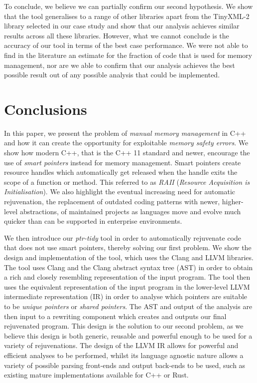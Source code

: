 \documentclass{mpaper}
\begin{document}
    To conclude, we believe we can partially confirm our second hypothesis.
    We show that the tool generalises to a range of other libraries apart from the TinyXML-2 library selected in our case study and show that our analysis achieves similar results across all these libraries. 
    However, what we cannot conclude is the accuracy of our tool in terms of the best case performance. 
    We were not able to find in the literature an estimate for the fraction of code that is used for memory management, nor are we able to confirm that our analysis achieves the best possible result out of any possible analysis that could be implemented.
    
    


    \section{Conclusions}\label{sec:conclusions}
    
    In this paper, we present the problem of \emph{manual memory management} in C++ and how it can create the opportunity for exploitable \emph{memory safety errors}. 
    We show how modern C++, that is the C++ 11 standard and newer, encourage the use of \emph{smart pointers} instead for memory management. 
    Smart pointers create resource handles which automatically get released when the handle exits the scope of a function or method. 
    This referred to as \emph{RAII} (\textit{Resource Acquisition is Initialisation}).
    We also highlight the eventual increasing need for automatic rejuvenation, the replacement of outdated coding patterns with newer, higher-level abstractions, of maintained projects as languages move and evolve much quicker than can be supported in enterprise environments.
    
    We then introduce our \emph{ptr-tidy} tool in order to automatically rejuvenate code that does not use smart pointers, thereby solving our first problem.
    We show the design and implementation of the tool, which uses the Clang and LLVM libraries. 
    The tool uses Clang and the Clang abstract syntax tree (AST) in order to obtain a rich and closely resembling representation of the input program.
    The tool then uses the equivalent representation of the input program in the lower-level LLVM intermediate representation (IR) in order to analyse which pointers are suitable to be \emph{unique pointers} or \emph{shared pointers}. 
    The AST and output of the analysis are then input to a rewriting component which creates and outputs our final rejuvenated program. 
    This design is the solution to our second problem, as we believe this design is both generic, reusable and powerful enough to be used for a variety of rejuvenations.
    The design of the LLVM IR allows for powerful and efficient analyses to be performed, whilst its language agnostic nature allows a variety of possible parsing front-ends and output back-ends to be used, such as existing mature implementations available for C++ or Rust.
    
\end{document}
